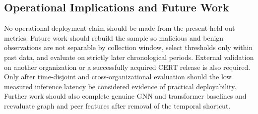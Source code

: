 \documentclass[journal]{IEEEtran}
\begin{document}
\subsection{Operational Implications and Future Work}
No operational deployment claim should be made from the present held-out metrics. Future work should rebuild the sample so malicious and benign observations are not separable by collection window, select thresholds only within past data, and evaluate on strictly later chronological periods. External validation on another organization or a successfully acquired CERT release is also required. Only after time-disjoint and cross-organizational evaluation should the low measured inference latency be considered evidence of practical deployability. Further work should also complete genuine GNN and transformer baselines and reevaluate graph and peer features after removal of the temporal shortcut.
\end{document}
